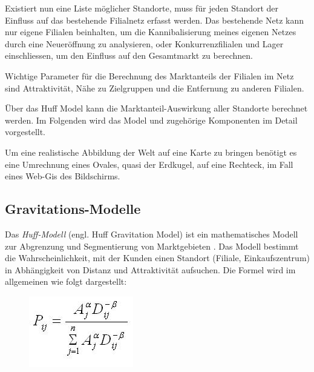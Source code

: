 Existiert nun eine Liste möglicher Standorte, muss für jeden Standort der Einfluss auf das bestehende Filialnetz erfasst werden.
Das bestehende Netz kann nur eigene Filialen beinhalten, um die Kannibalisierung meines eigenen Netzes durch eine Neueröffnung zu analysieren, oder Konkurrenzfilialen und Lager einschliessen, um den Einfluss auf den Gesamtmarkt zu berechnen.

Wichtige Parameter für die Berechnung des Marktanteils der Filialen im Netz sind Attraktivität, Nähe zu Zielgruppen und die Entfernung zu anderen Filialen.

Über das Huff Model kann die Marktanteil-Auswirkung aller Standorte berechnet werden.
Im Folgenden wird das Model und zugehörige Komponenten im Detail vorgestellt.



Um eine realistische Abbildung der Welt auf eine Karte zu bringen benötigt es eine Umrechnung eines Ovales, quasi der Erdkugel, auf eine Rechteck, im Fall eines Web-Gis des Bildschirms. 
\subsection{Gravitations-Modelle}
Das \textit{Huff-Modell} (engl. Huff Gravitation Model) ist ein mathematisches Modell zur Abgrenzung und Segmentierung von Marktgebieten \cite{Roy2004}.
Das Modell bestimmt die Wahrscheinlichkeit, mit der Kunden einen Standort (Filiale, Einkaufszentrum) in Abhängigkeit von Distanz und Attraktivität aufsuchen. 
Die Formel wird im allgemeinen wie folgt dargestellt:

\begin{figure}
	\centering
	\includegraphics[]{resources/images/huff_model}
	\label{img:huff_formula}
\end{figure}

